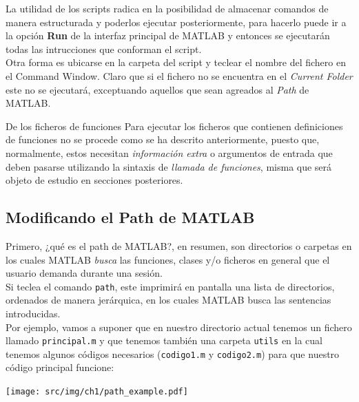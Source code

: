 La utilidad de los scripts radica en la posibilidad de almacenar
comandos de manera estructurada y poderlos ejecutar posteriormente, para
hacerlo puede ir a la opción \textbf{Run} de la interfaz principal de
MATLAB y entonces se ejecutarán todas las intrucciones que conforman el
script.\\

Otra forma es ubicarse en la carpeta del script y teclear el nombre del
fichero en el Command Window. Claro que si el fichero no se encuentra en
el \emph{Current Folder} este no se ejecutará, exceptuando aquellos que
sean agreados al \emph{Path} de MATLAB. \\

\begin{informacion}{De los ficheros de funciones}
Para ejecutar los ficheros que contienen
definiciones de funciones no se procede como se ha
descrito anteriormente, puesto que, normalmente, estos 
necesitan \emph{información extra} o argumentos de entrada que deben
pasarse utilizando la sintaxis de \emph{llamada de
funciones}, misma que será objeto de estudio en
secciones posteriores.
\end{informacion}

\subsection{Modificando el Path de MATLAB}\label{modificando-el-path-de-matlab}

Primero, ¿qué es el path de MATLAB?, en resumen, son directorios o
carpetas en los cuales MATLAB \emph{busca} las funciones, clases y/o
ficheros en general que el usuario demanda durante una sesión.\\

Si teclea el comando \texttt{path}, este imprimirá en pantalla una lista
de directorios, ordenados de manera jerárquica, en los cuales MATLAB
busca las sentencias introducidas.\\

Por ejemplo, vamos a suponer que en nuestro directorio actual tenemos un
fichero llamado \texttt{principal.m} y que tenemos también una carpeta
\texttt{utils} en la cual tenemos algunos códigos necesarios
(\texttt{codigo1.m} y \texttt{codigo2.m}) para que nuestro código
principal funcione:

\begin{center}
\texttt{[image: src/img/ch1/path\_example.pdf]}
\end{center}


